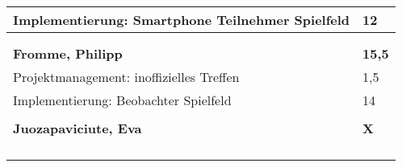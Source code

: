 \documentclass[a4paper,11pt]{scrartcl}
\begin{document}
\begin{longtable}{| p{13.8cm} | C{2.4cm} |}
  Implementierung: Smartphone Teilnehmer Spielfeld
	&
  12
	\\
	\hline


	&

	\\
	\hline


	&

	\\
	\hline
	\hline


	\textbf{Fromme, Philipp} & \textbf{15,5}\\ %
	\hline

	Projektmanagement: inoffizielles Treffen
	&
	1,5
	\\
	\hline

	Implementierung: Beobachter Spielfeld
	&
	14
	\\
	\hline


	&

	\\
	\hline
	\hline


	\textbf{Juozapaviciute, Eva} & \textbf{X}\\ %
	\hline


	&

	\\
	\hline


	&

	\\
	\hline


	&

	\\
	\hline


	&

	\\
	\hline
	\hline



\end{longtable}
\end{document}
